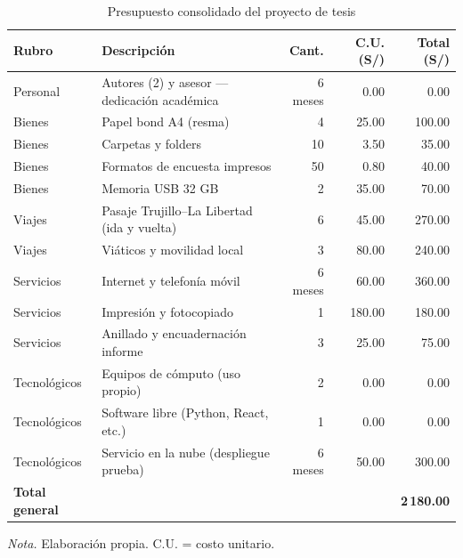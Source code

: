 \begin{table}[H]
\centering
\caption{Presupuesto consolidado del proyecto de tesis}
\label{tab:presupuesto_consolidado}
\small
\begin{tabularx}{\textwidth}{p{2.2cm}Xrrr}
\toprule
\textbf{Rubro} & \textbf{Descripci\'on} & \textbf{Cant.} & \textbf{C.U. (S/)} & \textbf{Total (S/)} \\
\midrule
Personal & Autores (2) y asesor --- dedicaci\'on acad\'emica & 6 meses & 0.00 & 0.00 \\
\midrule
Bienes & Papel bond A4 (resma) & 4 & 25.00 & 100.00 \\
Bienes & Carpetas y folders & 10 & 3.50 & 35.00 \\
Bienes & Formatos de encuesta impresos & 50 & 0.80 & 40.00 \\
Bienes & Memoria USB 32 GB & 2 & 35.00 & 70.00 \\
\midrule
Viajes & Pasaje Trujillo--La Libertad (ida y vuelta) & 6 & 45.00 & 270.00 \\
Viajes & Vi\'aticos y movilidad local & 3 & 80.00 & 240.00 \\
\midrule
Servicios & Internet y telefon\'ia m\'ovil & 6 meses & 60.00 & 360.00 \\
Servicios & Impresi\'on y fotocopiado & 1 & 180.00 & 180.00 \\
Servicios & Anillado y encuadernaci\'on informe & 3 & 25.00 & 75.00 \\
\midrule
Tecnol\'ogicos & Equipos de c\'omputo (uso propio) & 2 & 0.00 & 0.00 \\
Tecnol\'ogicos & Software libre (Python, React, etc.) & 1 & 0.00 & 0.00 \\
Tecnol\'ogicos & Servicio en la nube (despliegue prueba) & 6 meses & 50.00 & 300.00 \\
\midrule
\textbf{Total general} & & & & \textbf{2\,180.00} \\
\bottomrule
\end{tabularx}
\parbox{0.94\textwidth}{\small \textit{Nota.} Elaboraci\'on propia. C.U. = costo unitario.}
\end{table}
